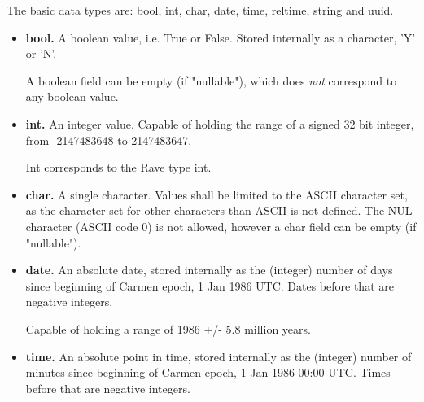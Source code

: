 \documentclass[techdoc]{nobs}   %
\begin{document}
The basic data types are: bool, int, char, date, time, reltime, string and uuid.

\begin{itemize}

\item {\bf bool.}
\label{sec:bool}
A boolean value, i.e. True or False. Stored internally as a character, 'Y' or 'N'.

A boolean field can be empty (if "nullable"), which does {\it not} correspond to
any boolean value.

\item {\bf int.}
\label{sec:int}
An integer value.
Capable of holding the range of a signed 32 bit integer, from -2147483648 to 2147483647.

Int corresponds to the Rave type int.

\item {\bf char.}
\label{sec:char}
A single character.
Values shall be limited to the ASCII character set,
as the character set for other characters than ASCII is not defined.
The NUL character (ASCII code 0) is not allowed, however a char field can be empty
(if "nullable").

\item {\bf date.}
\label{sec:date}
An absolute date, stored internally as the (integer) number of days
since beginning of Carmen epoch, 1 Jan 1986 UTC. Dates before that are
negative integers.


Capable of holding a range of 1986 +/- 5.8 million years.


\item {\bf time.}
\label{sec:time}
An absolute point in time, stored internally as the (integer) number
of minutes since beginning of Carmen epoch, 1 Jan 1986 00:00 UTC.
Times before that are negative integers.



\end{itemize}
\end{document}
